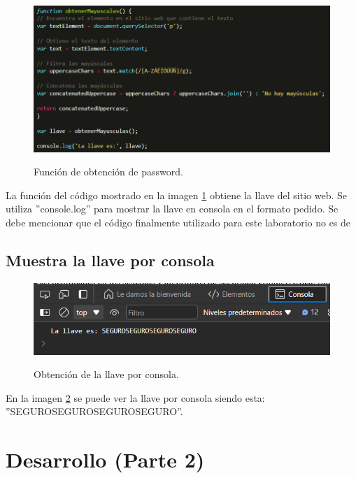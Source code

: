 \documentclass[letter,12pt]{article}
\begin{document}
    \begin{figure}[H]
        \centering
        \includegraphics[width=15cm]{img/parte 1/2.3.png}
        \label{fig: 2.3}
        \caption{Función de obtención de password.}
    \end{figure}

La función del código mostrado en la imagen \ref{fig: 2.3} obtiene la llave del sitio web. Se utiliza ''console.log'' para mostrar la llave en consola en el formato pedido. Se debe mencionar que el código finalmente utilizado para este laboratorio no es de 


\subsection{Muestra la llave por consola}

    \begin{figure}[H]
        \centering
        \includegraphics[width=15cm]{img/parte 1/2.4.png}
        \label{fig: 2.4}
        \caption{Obtención de la llave por consola.}
    \end{figure}

En la imagen \ref{fig: 2.4} se puede ver la llave por consola siendo esta: ''SEGUROSEGUROSEGUROSEGURO''.

\section{Desarrollo (Parte 2)}
\end{document}
